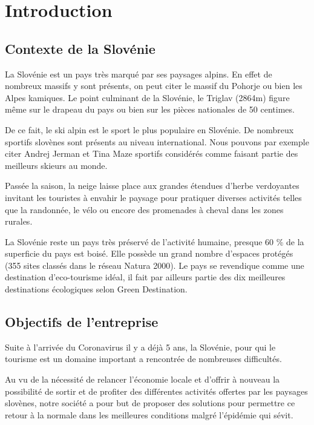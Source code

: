 
\chapter{Introduction}

\section{Contexte de la Slovénie}
La Slovénie est un pays très marqué par ses paysages alpins. En effet de nombreux massifs y sont présents, on peut citer le massif du Pohorje ou bien les Alpes kamiques. Le point culminant de la Slovénie, le Triglav (2864m) figure même sur le drapeau du pays ou bien sur les pièces nationales de 50 centimes.\n

De ce fait, le ski alpin est le sport le plus populaire en Slovénie. De nombreux sportifs slovènes sont présents au niveau international. Nous pouvons par exemple citer Andrej Jerman et Tina Maze sportifs considérés comme faisant partie des meilleurs skieurs au monde.\n

Passée la saison, la neige laisse place aux grandes étendues d'herbe verdoyantes invitant les touristes à envahir le paysage pour pratiquer diverses activités telles que la randonnée, le vélo ou encore des promenades à cheval dans les zones rurales.\n

La Slovénie reste un pays très préservé de l'activité humaine, presque 60 \% de la superficie du pays est boisé. Elle possède un grand nombre d'espaces protégés (355 sites classés dans le réseau Natura 2000). Le pays se revendique comme une destination d'eco-tourisme idéal, il fait  par ailleurs partie des dix meilleures destinations écologiques selon Green Destination. \n






\section{Objectifs de l'entreprise}

Suite à l'arrivée du Coronavirus il y a déjà 5 ans, la Slovénie, pour qui le tourisme est un domaine important a rencontrée de nombreuses difficultés. \n 

Au vu de la nécessité de relancer l'économie locale et d'offrir à nouveau la possibilité de sortir et de profiter des différentes activités offertes par les paysages slovènes, notre société a pour but de proposer des solutions pour permettre ce retour à la normale dans les meilleures conditions malgré l'épidémie qui sévit.\n

